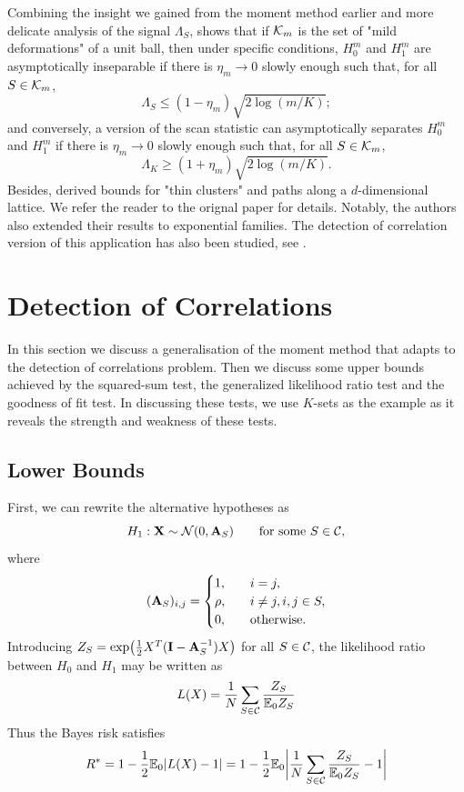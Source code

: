 \documentclass[10pt, oneside]{article}
\begin{document}
Combining the insight we gained from the moment method earlier and more delicate analysis of the signal $\Lambda_S$, \cite{arias2011detection} shows that if ${\mathcal K}_m$ is the set of "mild deformations" of a unit ball, then under specific conditions,
$H_0^m$ and $H_1^m$ are asymptotically inseparable if there is
$\eta_m \to0$ slowly enough such that, for all $S \in{\mathcal K}_m$,
\[
\Lambda_S \leq(1 - \eta_m) \sqrt{2 \log(m/K)};
\]
and conversely, a version of the scan statistic can asymptotically separates $H_0^m$ and $H_1^m$ if there is $\eta_m \to0$ slowly enough such that, for all $S \in{\mathcal K}_m$,
\[
\Lambda_K \geq(1 + \eta_m) \sqrt{2 \log(m/K)}.
\]
Besides, \cite{arias2011detection} derived bounds for "thin clusters" and paths along a $d$-dimensional lattice. We refer the reader to the orignal paper for details. Notably, the authors also extended their results to exponential families. The detection of correlation version of this application has also been studied, see \cite{arias2017detecting}.

\section{Detection of Correlations}

In this section we discuss a generalisation of the moment method that adapts to the detection of correlations problem. Then we discuss some upper bounds achieved by the squared-sum test, the generalized likelihood ratio test and the goodness of fit test. In discussing these tests, we use $K$-sets as the example as it reveals the strength and weakness of these tests.
\subsection{Lower Bounds}
First, we can rewrite the alternative hypotheses as $$H_1: \mathbf{X} \sim{\mathcal N}(0,\mathbf{A}_S)\qquad\mbox{for some $S \in{\mathcal C}$,}$$ where
$$(\mathbf{A}_S)_{i,j} = \begin{cases}
1, &\quad i = j, \cr
\rho, &\quad i \neq j, i, j \in S, \cr
0, &\quad \text{otherwise}.
\end{cases}$$
Introducing $Z_S = \exp\bigl(\tfrac{1}{2} X^T (\mathbf{I}- \mathbf{A}_S^{-1}) X \bigr)$ for all $S \in{\mathcal C}$, the likelihood ratio between $H_0$ and $H_1$ may be written as $$L(X) = \frac{1}{N} \sum_{S \in{\mathcal C}} \frac{Z_S}{\mathbb{E}_0 Z_S}$$ Thus the Bayes risk satisfies
$$R^* = 1 - \frac{1}{2} \mathbb{E}_0 |L(X) - 1| = 1 - \frac{1}{2} \mathbb{E}_0\biggl| \frac{1}{N} \sum_{S \in{\mathcal C}} \frac{Z_S}{\mathbb{E}_0 Z_S} - 1\biggr|$$
\end{document}
